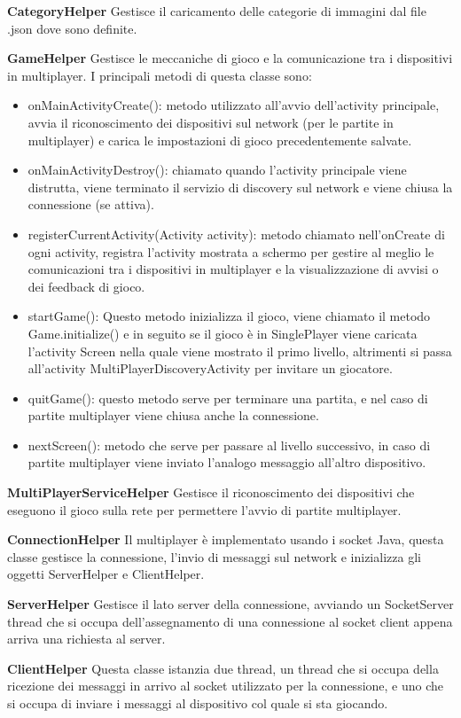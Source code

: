 \begin{description}
\item \textbf{CategoryHelper} Gestisce il caricamento delle categorie di immagini dal file .json dove sono definite.
\item \textbf{GameHelper} Gestisce le meccaniche di gioco e la comunicazione tra i dispositivi in multiplayer. I principali metodi di questa classe sono:
\begin{itemize}
\item onMainActivityCreate(): metodo utilizzato all'avvio dell'activity principale, avvia il riconoscimento dei dispositivi sul network (per le partite in multiplayer) e carica le impostazioni di gioco precedentemente salvate.
\item onMainActivityDestroy(): chiamato quando l'activity principale viene distrutta, viene terminato il servizio di discovery sul network e viene chiusa la connessione (se attiva).
\item registerCurrentActivity(Activity activity): metodo chiamato nell'onCreate di ogni activity, registra l'activity mostrata a schermo per gestire al meglio le comunicazioni tra i dispositivi in multiplayer e la visualizzazione di avvisi o dei feedback di gioco.
\item startGame(): Questo metodo inizializza il gioco, viene chiamato il metodo Game.initialize() e in seguito se il gioco \`{e} in SinglePlayer viene caricata l'activity Screen nella quale viene mostrato il primo livello, altrimenti si passa all'activity MultiPlayerDiscoveryActivity per invitare un giocatore.
\item quitGame(): questo metodo serve per terminare una partita, e nel caso di partite multiplayer viene chiusa anche la connessione.
\item nextScreen(): metodo che serve per passare al livello successivo, in caso di partite multiplayer viene inviato l'analogo messaggio all'altro dispositivo.
\end{itemize}
\item \textbf{MultiPlayerServiceHelper} Gestisce il riconoscimento dei dispositivi che eseguono il gioco sulla rete per permettere l'avvio di partite multiplayer.
\item \textbf{ConnectionHelper} Il multiplayer \`{e} implementato usando i socket Java, questa classe gestisce la connessione, l'invio di messaggi sul network e inizializza gli oggetti ServerHelper e ClientHelper.
\item \textbf{ServerHelper} Gestisce il lato server della connessione, avviando un SocketServer thread che si occupa dell'assegnamento di una connessione al socket client appena arriva una richiesta al server.
\item \textbf{ClientHelper} Questa classe istanzia due thread, un thread che si occupa della ricezione dei messaggi in arrivo al socket utilizzato per la connessione, e uno che si occupa di inviare i messaggi al dispositivo col quale si sta giocando.
\end{description}


